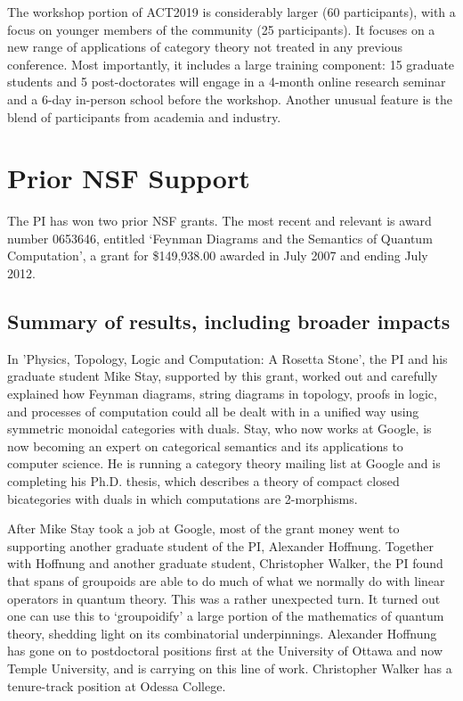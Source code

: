 \documentclass[12pt]{amsart}
\begin{document}
The workshop portion of ACT2019 is considerably larger (60
participants), with a focus on younger members of the community (25
participants).  It focuses on a new range of applications of category
theory not treated in any previous conference.  Most importantly, it
includes a large training component: 15 graduate students and 5
post-doctorates will engage in a 4-month online research seminar and a
6-day in-person school before the workshop.  Another unusual feature
is the blend of participants from academia and industry.



\section{Prior NSF Support}

The PI has won two prior NSF grants.  The most recent and relevant is award number 0653646, entitled `Feynman Diagrams and the Semantics of Quantum Computation', a grant for \$149,938.00 awarded in July 2007 and ending July 2012.   



\subsection{Summary of results, including broader impacts}

In 'Physics, Topology, Logic and Computation: A Rosetta Stone', the PI and his graduate student Mike Stay, supported by this grant, worked out and carefully explained how Feynman diagrams, string diagrams in topology, proofs in logic, and processes of computation could all be dealt with in a unified way using symmetric monoidal categories with duals. Stay, who now works at Google, is now becoming an expert on categorical semantics and its applications to computer science. He is running a category theory mailing list at Google and is completing his Ph.D. thesis, which describes a theory of compact closed bicategories with duals in which computations are 2-morphisms.  

After Mike Stay took a job at Google, most of the grant money went to supporting another graduate student of the PI, Alexander Hoffnung.  Together with Hoffnung and another graduate student, Christopher Walker, the PI found that spans of groupoids are able to do much of what we normally do with linear operators in quantum theory. This was a rather unexpected turn.  It turned out one can use this to `groupoidify' a large portion of the mathematics of quantum theory, shedding light on its combinatorial underpinnings.   Alexander Hoffnung has gone on to postdoctoral positions first at the University of Ottawa and now Temple University, and is carrying on this line of work.  Christopher Walker has a tenure-track position at Odessa College.
\end{document}
